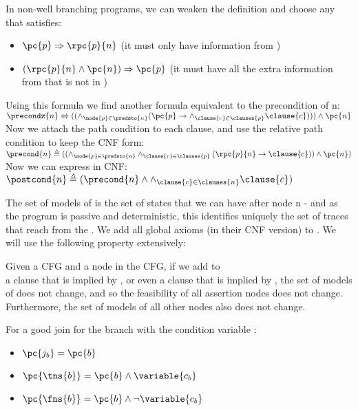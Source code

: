 In non-well branching programs, we can weaken the definition and choose any  that satisfies:
\begin{itemize}
	\item $ \Rightarrow \rpc{p}{n}$ (it must only have information from \pc{p})
	\item $(\rpc{p}{n} \land \pc{n}) \Rightarrow \pc{p}$ (it must have all the extra information from  that is not in )
\end{itemize}

Using this formula we find another formula equivalent to the precondition of n: \\
$\precondz{n} \Leftrightarrow ((\land_{\node{p} \in \predsto{n}} (\pc{p} \rightarrow \land_{\clause{c} \in \clauses{p}} \clause{c}))) \land \pc{n}$ \\
Now we attach the path condition to each clause, and use the relative path condition to keep the CNF form:\\
$\precond{n} \triangleq ((\land_{\node{p} \in \predsto{n}} \land_{\clause{c} \in \clauses{p}} (\rpc{p}{n} \rightarrow \clause{c})) \land \pc{n})$\\
Now we can express  in CNF:\\
$\postcond{n} \triangleq (\precond{n} \land \land_{\clause{c} \in \clauses{n}} \clause{c} )$

The set of models of  is the set of states that we can have after node n - and as the program is passive and deterministic, this identifies uniquely the set of traces that reach  from the .
We add all global axioms (in their CNF version) to .
We will use the following property extensively:

\begin{lemma}
\label{lem:clauses}
Given a CFG and a node  in the CFG, if we add to \\
  a clause that is implied by , or even a clause that is implied by , the set of models of  does not change, and so the feasibility of all assertion nodes does not change.
Furthermore, the set of models of all other nodes also does not change.
\end{lemma}

\begin{lemma}
For a good join  for the branch  with the condition variable :
\begin{itemize}
	\item $\pc{j_b}=\pc{b}$
	\item $\pc{\tns{b}}=\pc{b} \land \variable{c_b}$
	\item $\pc{\fns{b}}=\pc{b} \land \lnot\variable{c_b}$
\end{itemize}
\end{lemma}

